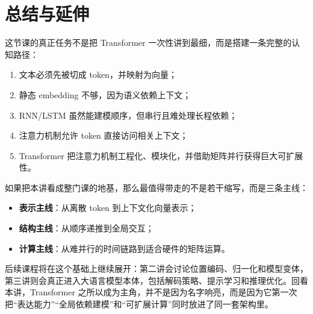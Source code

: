 \documentclass[a4paper]{article}
\begin{document}
\section{总结与延伸}

这节课的真正任务不是把 Transformer 一次性讲到最细，而是搭建一条完整的认知路径：
\begin{enumerate}
\item 文本必须先被切成 token，并映射为向量；
\item 静态 embedding 不够，因为语义依赖上下文；
\item RNN/LSTM 虽然能建模顺序，但串行且难处理长程依赖；
\item 注意力机制允许 token 直接访问相关上下文；
\item Transformer 把注意力机制工程化、模块化，并借助矩阵并行获得巨大可扩展性。
\end{enumerate}

如果把本讲看成整门课的地基，那么最值得带走的不是若干缩写，而是三条主线：
\begin{itemize}
\item \textbf{表示主线}：从离散 token 到上下文化向量表示；
\item \textbf{结构主线}：从顺序递推到全局交互；
\item \textbf{计算主线}：从难并行的时间链路到适合硬件的矩阵运算。
\end{itemize}

后续课程将在这个基础上继续展开：第二讲会讨论位置编码、归一化和模型变体，第三讲则会真正进入大语言模型本体，包括解码策略、提示学习和推理优化。回看本讲，Transformer 之所以成为主角，并不是因为名字响亮，而是因为它第一次把“表达能力”“全局依赖建模”和“可扩展计算”同时放进了同一套架构里。
\end{document}
